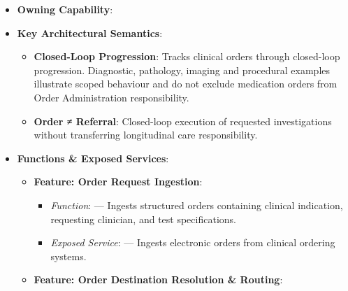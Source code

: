 \begin{itemize}

\item
\textbf{Owning Capability}: \texttt{}



\item
\textbf{Key Architectural Semantics}:


\begin{itemize}

\item
\textbf{Closed-Loop Progression}: Tracks clinical orders through closed-loop progression. Diagnostic, pathology, imaging and procedural examples illustrate scoped behaviour and do not exclude medication orders from Order Administration responsibility.



\item
\textbf{Order ≠ Referral}: Closed-loop execution of requested investigations without transferring longitudinal care responsibility.



\end{itemize}


\item
\textbf{Functions \& Exposed Services}:


\begin{itemize}

\item
\textbf{Feature: Order Request Ingestion}:


\begin{itemize}

\item
\emph{Function}: \texttt{} — Ingests structured orders containing clinical indication, requesting clinician, and test specifications.



\item
\emph{Exposed Service}: \texttt{} — Ingests electronic orders from clinical ordering systems.



\end{itemize}


\item
\textbf{Feature: Order Destination Resolution \& Routing}:


\begin{itemize}


\end{itemize}
\end{itemize}
\end{itemize}
